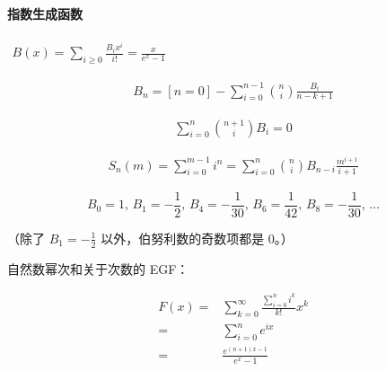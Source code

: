 \paragraph{指数生成函数} $\begin{aligned} B(x)=\sum_{i\ge 0}\frac{B_i x^i}{i!}=\frac x{e^x-1} \end{aligned}$

$$ \begin{aligned}B_n=[n=0]-\sum_{i=0}^{n-1}{n\choose i}\frac{B_i}{n-k+1}\end{aligned} $$

$$ \begin{aligned}\sum_{i=0}^n{n+1\choose i}B_i=0\end{aligned} $$

$$ \begin{aligned}S_n(m)=\sum_{i=0}^{m-1}i^n=\sum_{i=0}^n{n\choose i}B_{n-i}\frac{m^{i+1}}{i+1}\end{aligned} $$

$$ B_0 = 1,\, B_1 = -\frac 1 2,\, B_4 = -\frac 1 {30},\, B_6 = \frac 1 {42},\, B_8 = -\frac 1{30},\, \dots $$

（除了 $B_1 = -\frac 1 2$ 以外，伯努利数的奇数项都是 $0$。）

自然数幂次和关于次数的 EGF：

$$ \begin{aligned} F(x)=&\sum_{k=0}^\infty \frac{\sum_{i=0}^n i^k}{k!}x^k\\ =&\sum_{i=0}^n e^{ix}\\ =&\frac{e^{(n+1)x-1}}{e^x-1} \end{aligned} $$
